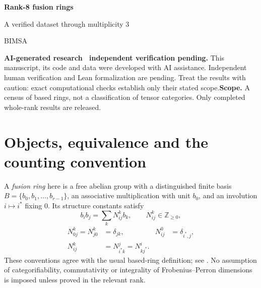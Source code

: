 \documentclass[11pt,a4paper]{article}
\theoremstyle{definition}\newtheorem{definition}[theorem]{Definition}\newtheorem{remark}[theorem]{Remark}
\newcommand{\NN}{\mathbb Z_{\geq0}}\newcommand{\FPdim}{\operatorname{FPdim}}
\begin{document}
\par\vspace{1cm}
{\sffamily\Huge\bfseries\color{ink} Rank-8 fusion rings\par}
\vspace{0.35cm}
{\sffamily\Large A verified dataset through multiplicity 3\par}
\vspace{0.65cm}{\large Sébastien Palcoux}\par{\small BIMSA}\par\vspace{0.35cm}{\small Computational companion, 26 October 2026}\par\vspace{0.8cm}
\begin{abstract}
We document 4,500 verified based-isomorphism classes of fusion rings of rank 8 through multiplicity 3, including 3,527 at the maximum multiplicity. The producer reports a complete enumeration. The complete optimized source is supplied and hash-matched, but full enumeration has not been independently reproduced. The account separates the mathematical coverage argument, the completed search, and independent verification of the emitted tensors. All duality types are included, and no categorifiability filter is applied. Code, machine-readable counts, full multiplication tensors and provenance records accompany the text.
\end{abstract}\vspace{0.4cm}\noindent\textbf{AI-generated research \textperiodcentered\ independent verification pending.} This manuscript, its code and data were developed with AI assistance. Independent human verification and Lean formalization are pending. Treat the results with caution: exact computational checks establish only their stated scope.\vfill\noindent\textbf{Scope.} A census of based rings, not a classification of tensor categories. Only completed whole-rank results are released.\newpage\tableofcontents\newpage

\section{Objects, equivalence and the counting convention}
A \emph{fusion ring} here is a free abelian group with a distinguished finite basis
$B=\{b_0,b_1,\ldots,b_{r-1}\}$, an associative multiplication with unit $b_0$,
and an involution $i\mapsto i^*$ fixing $0$. Its structure constants satisfy
\[
b_i b_j=\sum_k N_{ij}^{k}b_k,\qquad N_{ij}^{k}\in\NN,
\]
\begin{align}
N_{0j}^{k}=N_{j0}^{k}&=\delta_{jk},&N_{ij}^{0}&=\delta_{i^*,j},\\
N_{ij}^{k}&=N_{i^*k}^{j}=N_{kj^*}^{i}.&&\label{eq:reciprocity}
\end{align}
These conventions agree with the usual based-ring definition; see
\cite{EGNO,VS}. No assumption of categorifiability, commutativity or integrality
of Frobenius--Perron dimensions is imposed unless proved in the relevant rank.
\end{document}
